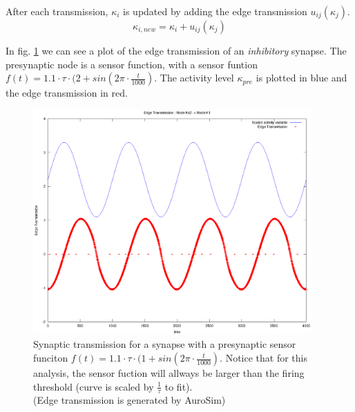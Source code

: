 			After each transmission, $\kappa_i$ is updated by adding the edge transmission $u_{ij}(\kappa_j)$. 	 	 %
			\begin{equation}
				\kappa_{i, new} = \kappa_{i} + u_{ij}(\kappa_j)
			\end{equation}
			
			
			
			In fig. \ref{figEdgeTransmissionKaboveT} we can see a plot of the edge transmission of an \emph{inhibitory} synapse.
			The presynaptic node is a sensor function, with a sensor funtion \mbox{$f(t) = 1.1 \cdot \tau \cdot (2 + sin( 2\pi \cdot \frac{t}{1000})$}.
			The activity level $\kappa_{pre}$ is plotted in blue and the edge transmission in red.
	
\begin{figure}[hb!tp]
	\centering
	\includegraphics[width=0.95\textwidth]{./synapticTransmissionPlots/eps_transmissionKappaAboveThreshold.eps} 	
	\caption{Synaptic transmission for a synapse with a presynaptic sensor funciton \mbox{$f(t) = 1.1 \cdot \tau \cdot (1 + sin( 2\pi \cdot \frac{t}{1000})$}. 
			Notice that for this analysis, the sensor fuction will allways be larger than the firing threshold (curve is scaled by $\frac{1}{\tau}$ to fit). \\
			(Edge transmission is generated by AuroSim)} 
	\label{figEdgeTransmissionKaboveT}
\end{figure}

